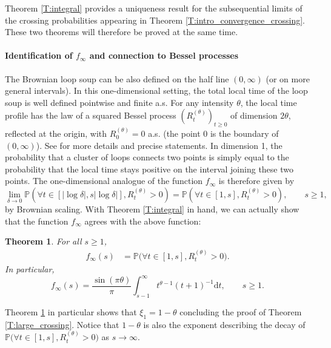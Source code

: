 \documentclass[11pt]{article}
\newtheorem{theorem}{Theorem}[section]
\theoremstyle{remark}
\newcommand{\Prob}[1]{\mathbb{P} \left( #1 \right) }
\renewcommand{\P}{\mathbb{P}}
\renewcommand{\d}{\mathrm{d}}
\numberwithin{equation}{section}
\begin{document}
Theorem \ref{T:integral} provides a uniqueness result for the subsequential limits of the crossing probabilities appearing in Theorem \ref{T:intro_convergence_crossing}. These two theorems will therefore be proved at the same time.


\paragraph*{Identification of $f_\infty$ and connection to Bessel processes}

The Brownian loop soup can be also defined on the half line $(0,\infty)$ (or on more general intervals). In this one-dimensional setting, the total local time of the loop soup is well defined pointwise and finite a.s. For any intensity $\theta$, the local time profile has the law of a squared Bessel process $(R_t^{(\theta)})_{t \geq 0}$ of dimension $2\theta$, reflected at the origin, with $R_0^{(\theta)} = 0$ a.s. (the point 0 is the boundary of $(0,\infty)$). See \cite{Lupu18} for more details and precise statements. 
In dimension 1, the probability that a cluster of loops connects two points is simply equal to the probability that the local time stays positive on the interval joining these two points. The one-dimensional analogue of the function $f_\infty$ is therefore given by
\[
\lim_{\delta \to 0} \Prob{ \forall t \in [|\log \delta|, s |\log \delta|], R_t^{(\theta)} > 0} = \Prob{ \forall t \in [1,s], R_t^{(\theta)} >0 }, \quad \quad s \geq 1,
\]
by Brownian scaling. With Theorem \ref{T:integral} in hand, we can actually show that the function $f_\infty$ agrees with the above function:

\begin{theorem}\label{T:Bessel}
For all $s \geq 1$,
\begin{align*}
f_\infty(s) & = \P \big( \forall t \in [1,s], R_t^{(\theta)} >0 \big).
\end{align*}
In particular,
\begin{equation}
\label{E:f_infty_Bessel}
f_\infty(s)
= \frac{\sin(\pi \theta)}{\pi} \int_{s-1}^\infty t^{\theta-1} (t+1)^{-1} \d t,
\quad \quad s \geq 1.
\end{equation}
\end{theorem}


Theorem \ref{T:Bessel} in particular shows that $\xi_1 = 1-\theta$ concluding the proof of Theorem \ref{T:large_crossing}. Notice that $1-\theta$ is also the exponent describing the decay of $\P \big( \forall t \in [1,s], R_t^{(\theta)} >0 \big)$ as $s \to \infty$.
\end{document}
